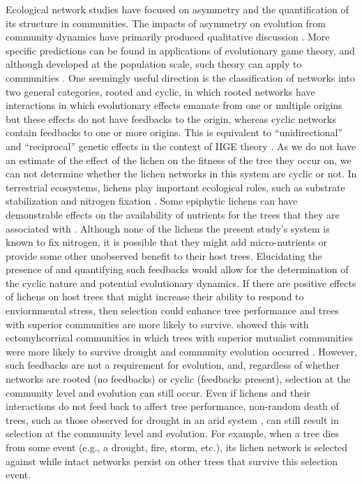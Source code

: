 \documentclass[fleqn,12pt]{olplainarticle}
\begin{document}
Ecological network studies have focused on asymmetry and the
quantification of its structure in communities. The impacts of
asymmetry on evolution from community dynamics have primarily produced
qualitative discussion \citep{Bascompte2006, Diaz-Castelazo2010,
  Guimaraes2011, Thompson2013}. More specific predictions can be found
in applications of evolutionary game theory, and although developed at
the population scale, such theory can apply to communities
\citep{Lieberman2005EvolutionaryGraphs}. One seemingly useful
direction is the classification of networks into two general
categories, rooted and cyclic, in which rooted networks have
interactions in which evolutionary effects emanate from one or
multiple origins but these effects do not have feedbacks to the
origin, whereas cyclic networks contain feedbacks to one or more
origins. This is equivalent to ``unidirectional'' and ``reciprocal''
genetic effects in the context of IIGE theory
\citep{Whitham2020IntraspecificEvolution}. As we do not have an
estimate of the effect of the lichen on the fitness of the tree they
occur on, we can not determine whether the lichen networks in this
system are cyclic or not. In terrestrial ecosystems, lichens play
important ecological roles, such as substrate stabilization
\citep{Root2011BioticWashington} and nitrogen fixation
\citep{Nelson2018LichenHelens}. Some epiphytic lichens can have
demonstrable effects on the availability of nutrients for the trees
that they are associated with \citep{Norby1989NitrogenDioxide}.
Although none of the lichens the present study's system is known to
fix nitrogen, it is possible that they might add micro-nutrients or
provide some other unobserved benefit to their host trees. Elucidating
the presence of and quantifying such feedbacks would allow for the
determination of the cyclic nature and potential evolutionary
dynamics. If there are positive effects of lichens on host trees that
might increase their ability to respond to enviornmental stress, then
selection could enhance tree performance and trees with superior
communities are more likely to survive.  \cite{Gehring2014PlantChange,
  Gehring2017a} showed this with ectomyhcorrizal communities in which
trees with superior mutualist communities were more likely to survive
drought and community evolution occurred \citep{Whitham2020}.
However, such feedbacks are not a requirement for evolution, and,
regardless of whether networks are rooted (no feedbacks) or cyclic
(feedbacks present), selection at the community level and evolution
can still occur.  Even if lichens and their interactions do not feed
back to affect tree performance, non-random death of trees, such as
those observed for drought in an arid system \cite{Sthultz2009}, can
still result in selection at the community level and evolution. For
example, when a tree dies from some event (e.g., a drought, fire,
storm, etc.), its lichen network is selected against while intact
networks persist on other trees that survive this selection event.
\end{document}
